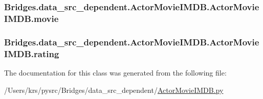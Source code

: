 \subsubsection[{movie}]{\setlength{\rightskip}{0pt plus 5cm}Bridges.\+data\+\_\+src\+\_\+dependent.\+Actor\+Movie\+I\+M\+D\+B.\+Actor\+Movie\+I\+M\+D\+B.\+movie}\label{class_bridges_1_1data__src__dependent_1_1_actor_movie_i_m_d_b_1_1_actor_movie_i_m_d_b_a07aa8e1726948fa805165497eb9b4c8c}
\hypertarget{class_bridges_1_1data__src__dependent_1_1_actor_movie_i_m_d_b_1_1_actor_movie_i_m_d_b_aa6b0a5eefa9dd1d2e3734cebcad53773}{}
\subsubsection[{rating}]{\setlength{\rightskip}{0pt plus 5cm}Bridges.\+data\+\_\+src\+\_\+dependent.\+Actor\+Movie\+I\+M\+D\+B.\+Actor\+Movie\+I\+M\+D\+B.\+rating}\label{class_bridges_1_1data__src__dependent_1_1_actor_movie_i_m_d_b_1_1_actor_movie_i_m_d_b_aa6b0a5eefa9dd1d2e3734cebcad53773}


The documentation for this class was generated from the following file\+:\begin{DoxyCompactItemize}
\item 
/\+Users/krs/pysrc/\+Bridges/data\+\_\+src\+\_\+dependent/\hyperlink{_actor_movie_i_m_d_b_8py}{Actor\+Movie\+I\+M\+D\+B.\+py}\end{DoxyCompactItemize}
